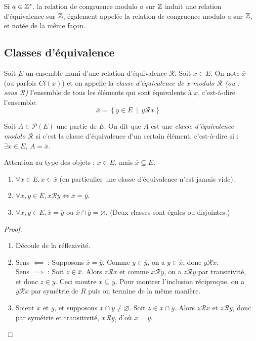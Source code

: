\begin{definition}
Si $a\in \mathbb{Z}^*$, la relation de congruence modulo $a$ sur $\mathbb{Z}$ induit une relation d'équivalence sur $\mathbb{Z}$, également appelée la relation de congruence modulo $a$ sur $\mathbb{Z}$, et notée de la même façon.
\end{definition}

\subsection{Classes d'équivalence}
\begin{definition}
Soit $E$ un ensemble muni d'une relation d'équivalence ${\mathcal R}$. Soit $x\in E$. On note $\overline{x}$ (ou parfois $Cl(x)$) et on appelle la \emph{classe d'équivalence de $x$ modulo $\mathcal R$ (ou : sous $\mathcal R$)} l'ensemble  de tous les éléments qui sont équivalents à $x$, c'est-à-dire l'ensemble:
\[
\overline x = \left\{y\in E\:\mid\: y{\mathcal R}x\right\}
\]


Soit $A\in \mathcal P(E)$ une partie de $E$. On dit que $A$ est une \emph{classe d'équivalence modulo $\mathcal R$} si c'est la classe d'équivalence d'un certain élément, c'est-à-dire si : $\exists x\in E, \: A=\overline x$.
\end{definition}

Attention au type des objets : $x \in E$, mais $\overline{x} \subseteq E$.

\begin{proposition}
\begin{enumerate}
\item $\forall x\in E, x\in \overline{x}$ (en particulier une classe d'équivalence n'est jamais vide).
\item $\forall x, y\in E, x{\mathcal R}y \iff \overline{x}=\overline{y}$.
\item $\forall x, y\in E, \overline{x} = \overline{y} \text{ ou } \overline{x}\cap \overline{y}=\varnothing$. (Deux classes sont égales ou disjointes.)
\end{enumerate}
\end{proposition}
\begin{proof}
\begin{enumerate}
\item Découle de la réflexivité.
\item Sens $\impliedby$ : Supposons $\overline{x}=\overline{y}$. Comme $y\in \overline{y}$, on a $y\in \overline{x}$, donc $y{\mathcal R}x$.\\
Sens $\implies$ : Soit $z\in \overline{x}$. Alors $z{\mathcal R}x$ et comme $x{\mathcal R}y$, on a $z{\mathcal R}y$ par transitivité, et donc $z\in \overline{y}$. Ceci montre $\overline{x}\subseteq \overline{y}$. Pour montrer l'inclusion réciproque, on a $y{\mathcal R}x$ par symétrie de $R$ puis on termine de la même manière.
\item Soient $x$ et $y$, et supposons $\overline{x}\cap \overline{y} \neq \varnothing$. Soit $z\in \overline{x}\cap \overline{y}$. Alors $z\mathcal R x$ et $z\mathcal R y$, donc par symétrie et transitivité, $x\mathcal R y$, d'où $\overline{x}=\overline{y}$.
\end{enumerate}
\end{proof}

